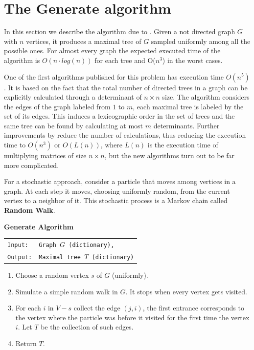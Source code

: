 
\chapter{The Generate algorithm} %

\label{AppendixA} %


In this section we describe the algorithm due to \cite[Broder 89]{Broder89}. Given a not directed graph $G$ with $n$ vertices, it produces a maximal tree of $G$ sampled uniformly among all the possible ones. For almost every graph the expected executed time of the algorithm is $O(n\cdot log(n) )$ for each tree and O($n^{3}$) in the worst cases. 

One of the first algorithms published for this problem has execution time $O (n^{5})$. It is based on the fact that the total number of directed trees in a graph can be explicitly calculated through a determinant of $n \times n$ size. The algorithm considers the edges of the graph labeled from $1$ to $m$, each maximal tree is labeled by the set of its edges. This induces a lexicographic order in the set of trees and the same tree can be found by calculating at most $m$ determinants. Further improvements by \cite[Colbourn 89]{CDM88} reduce the number of calculations, thus reducing the execution time to $O(n^3)$ or $O(L(n))$, where $L(n)$ is the execution time of multiplying matrices of size $n\times n$, but the new algorithms turn out to be far more complicated.

For a stochastic approach, consider a particle that moves among vertices in a graph. At each step it moves, choosing uniformly random, from the current vertex to a neighbor of it. This stochastic process is a Markov chain called \textbf{Random Walk}.

\begin{cajita}
\textbf{Generate Algorithm}\hfill \break
\begin{tabular}{ l l }
\texttt{Input:} &  \texttt{Graph $G$ (dictionary),} \\
\texttt{Output:} & \texttt{Maximal tree $T$ (dictionary)} \\
\end{tabular}

\begin{enumerate}
\item Choose a random vertex $s$ of $G$ (uniformly).
\item Simulate a simple random walk in $G$. It stops when every vertex gets visited. 
\item For each $i$ in $V-s$ collect the edge $(j,i)$, the first entrance corresponds to the vertex where the particle was before it visited for the first time the vertex $i$. Let $T$ be the collection of such edges.
\item Return $T$.
\end{enumerate}
\end{cajita}

